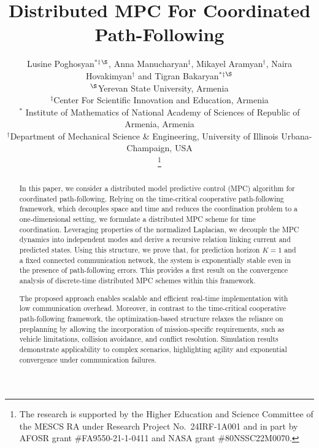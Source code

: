 \documentclass[letterpaper,journal]{IEEEtran}
\begin{document}
\title{Distributed MPC For Coordinated Path-Following}

 \author{
 Lusine Poghosyan$^{*}$$^\ddagger$$^{\S}$, 
Anna Manucharyan$^\ddagger$, Mikayel Aramyan$^\dagger$, Naira Hovakimyan$^\dagger$ and Tigran Bakaryan$^{*}$$^\ddagger$$^{\S}$\\

$^\S$Yerevan State University, Armenia
\\
$^\ddagger$Center For Scientific Innovation and Education, Armenia\\
$^{*}$ Institute of Mathematics of National Academy of Sciences of Republic of Armenia, Armenia\\
$^\dagger$Department of Mechanical Science \& Engineering, University of Illinois Urbana-Champaign, USA

\thanks{The research is supported by the Higher Education and Science Committee of the MESCS RA under Research Project No.~24IRF-1A001 and  in part by AFOSR grant \#FA9550-21-1-0411 and NASA grant \#80NSSC22M0070.}
}

\maketitle

\begin{abstract}
In this paper, we consider a distributed model predictive control (MPC) algorithm for coordinated path-following. Relying on the time-critical cooperative path-following framework, which decouples space and time and reduces the coordination problem to a one-dimensional setting, we formulate a distributed MPC scheme for time coordination.
Leveraging properties of the normalized Laplacian, we decouple the MPC dynamics into independent modes and derive a recursive relation linking current and predicted states. Using this structure, we prove that, for prediction horizon 
$K=1$ and a fixed connected communication network, the system is exponentially stable even in the presence of path-following errors. This provides a first result on the convergence analysis of discrete-time distributed MPC schemes within this framework.

The proposed approach enables scalable and efficient real-time implementation with low communication overhead. Moreover, in contrast to the time-critical cooperative path-following framework, the optimization-based structure relaxes the reliance on preplanning by allowing the incorporation of mission-specific requirements, such as vehicle limitations, collision avoidance, and conflict resolution. Simulation results demonstrate applicability to complex scenarios, highlighting agility and exponential convergence under communication failures.
\end{abstract}
\end{document}
